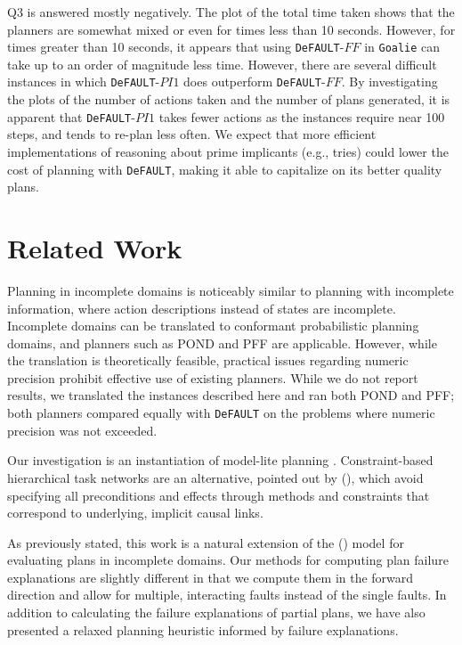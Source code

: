 \documentclass[letterpaper]{article}
\def\FFRISKY{{\tt DeFAULT}}
\def\goalie{{\tt Goalie}}
\def\citep#1{\cite{#1}}
\def\citet#1{\citeauthor{#1} (\citeyear{#1})}
\begin{document}
Q3 is answered mostly negatively. 
The plot of the total time taken shows that the planners are somewhat mixed or even for
times less than 10 seconds.  However, for times greater than 10 seconds, it
appears that using \FFRISKY-$FF$ in \goalie{} can take up to an order of
magnitude less time.  However, there are several difficult instances in
which \FFRISKY-$PI1$ does outperform \FFRISKY-$FF$.  By investigating the plots
of the number of actions taken and the number of plans generated, it is apparent
that \FFRISKY-$PI1$ takes fewer actions as the instances require near 100 steps,
and tends to re-plan less often.  We expect that more efficient implementations
of reasoning about prime implicants (e.g., tries) could lower the cost of
planning with \FFRISKY{}, making it able to capitalize on its better quality
plans.


\section{Related Work}

Planning in incomplete domains is noticeably similar to planning with incomplete
information, where action descriptions instead of states are incomplete. 
Incomplete domains can be translated to conformant probabilistic planning
domains, and planners such as POND \citep{aij-mclug} and PFF \citep{pff} are
applicable.  However, while the translation is theoretically feasible, practical
issues regarding numeric precision prohibit effective use of existing planners. 
While we do not report results, we translated the instances described here and
ran both POND and PFF; both planners compared equally with \FFRISKY{} on the
problems where numeric precision was not exceeded.

Our investigation is an instantiation of model-lite planning \citep{modellite}.  Constraint-based hierarchical task networks are an alternative, pointed out by \citet{modellite},  which avoid specifying all preconditions and effects through methods and constraints that correspond to underlying, implicit causal links.

As previously stated, this work is a natural extension of the \citet{Garland02} model for evaluating plans in incomplete domains.  Our methods for computing plan failure explanations are slightly different in that we compute them in the forward direction and allow for multiple, interacting faults instead of the single faults.  In addition to calculating the failure explanations of partial plans, we have also presented a relaxed planning heuristic informed by failure explanations.
\end{document}
